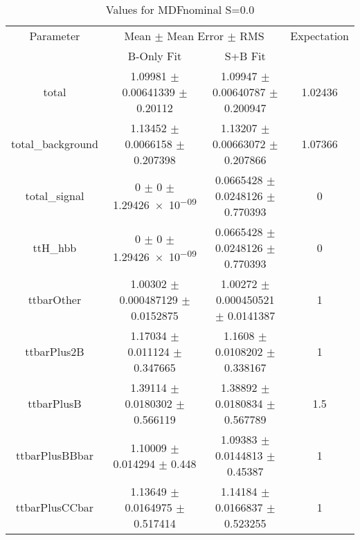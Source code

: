 \begin{table}
\centering
\caption{Values for MDFnominal S=0.0}
\begin{tabular}{cccc}
\toprule
Parameter & \multicolumn{2}{c}{Mean $\pm$ Mean Error $\pm$ RMS} & Expectation\\
 & B-Only Fit & S+B Fit & \\
\midrule
total & \num{1.09981} $\pm$ \num{0.00641339} $\pm$ \num{0.20112} & \num{1.09947} $\pm$ \num{0.00640787} $\pm$ \num{0.200947} & \num{1.02436}\\
total\_background & \num{1.13452} $\pm$ \num{0.0066158} $\pm$ \num{0.207398} & \num{1.13207} $\pm$ \num{0.00663072} $\pm$ \num{0.207866} & \num{1.07366}\\
total\_signal & \num{0} $\pm$ \num{0} $\pm$ \num{1.29426e-09} & \num{0.0665428} $\pm$ \num{0.0248126} $\pm$ \num{0.770393} & \num{0}\\
ttH\_hbb & \num{0} $\pm$ \num{0} $\pm$ \num{1.29426e-09} & \num{0.0665428} $\pm$ \num{0.0248126} $\pm$ \num{0.770393} & \num{0}\\
ttbarOther & \num{1.00302} $\pm$ \num{0.000487129} $\pm$ \num{0.0152875} & \num{1.00272} $\pm$ \num{0.000450521} $\pm$ \num{0.0141387} & \num{1}\\
ttbarPlus2B & \num{1.17034} $\pm$ \num{0.011124} $\pm$ \num{0.347665} & \num{1.1608} $\pm$ \num{0.0108202} $\pm$ \num{0.338167} & \num{1}\\
ttbarPlusB & \num{1.39114} $\pm$ \num{0.0180302} $\pm$ \num{0.566119} & \num{1.38892} $\pm$ \num{0.0180834} $\pm$ \num{0.567789} & \num{1.5}\\
ttbarPlusBBbar & \num{1.10009} $\pm$ \num{0.014294} $\pm$ \num{0.448} & \num{1.09383} $\pm$ \num{0.0144813} $\pm$ \num{0.45387} & \num{1}\\
ttbarPlusCCbar & \num{1.13649} $\pm$ \num{0.0164975} $\pm$ \num{0.517414} & \num{1.14184} $\pm$ \num{0.0166837} $\pm$ \num{0.523255} & \num{1}\\
\bottomrule
\end{tabular}
\end{table}